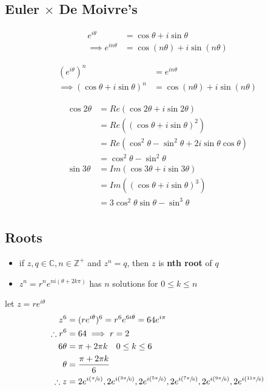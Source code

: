 	\subsection{Euler $\times$ De Moivre's}
		\begin{theorem}
			\begin{align*}
				e^{i\theta}&=\cos\theta+i\sin\theta\\
				\implies e^{in\theta}&=\cos(n\theta)+i\sin(n\theta)
			\end{align*}
		\end{theorem}
		\begin{theorem}[De Moivre's]
			\begin{align*}
				(e^{i\theta})^n&=e^{in\theta}\\
				\implies (\cos\theta+i\sin\theta)^n&=\cos(n\theta)+i\sin(n\theta)\tag*{from Euler's}
			\end{align*}
		\end{theorem}
		\begin{example}[$\cos2\theta=\cos^2\theta-\sin^2\theta\quad\sin3\theta=3\cos^2\theta\sin\theta-\sin^3\theta$]
			\begin{align*}
				\cos2\theta&=Re(\cos2\theta+i\sin2\theta)\\
				&=Re((\cos\theta+i\sin\theta)^2)\tag*{De Moivre}\\
				&=Re(\cos^2\theta-\sin^2\theta+2i\sin\theta\cos\theta)\\
				&=\cos^2\theta-\sin^2\theta\\
				\sin3\theta&=Im(\cos3\theta+i\sin3\theta)\\
			    &=Im((\cos\theta+i\sin\theta)^3)\tag*{De Moivre}\\
				&=3\cos^2\theta\sin\theta-\sin^3\theta\\
			\end{align*}
		\end{example}
	\subsection{Roots}
		\begin{theorem}[Roots]
			\begin{itemize}
			   \item if $z,q\in\mathbb{C},n\in\mathbb{Z}^+$ and $z^n=q$, then $z$ is \textbf{nth root} of $q$
			   \item $z^n=r^ne^{ni(\theta+2k\pi)}$ has $n$ solutions for $0\le k\le n$
			\end{itemize}
		\end{theorem}
		\begin{example}[Solve $z^6=-64$]
			let $z=re^{i\theta}$
			\begin{align*}
				z^6&=(re^{i\theta})^6=r^6e^{6i\theta}=64e^{i\pi}\\
				\therefore r^6&=64\implies r=2\\
				6\theta&=\pi+2\pi k\quad 0\le k\le6\\
				\theta&=\frac{\pi+2\pi k}6\\
				\therefore z&=2e^{i(\sfrac{\pi}6)},2e^{i(\sfrac{3\pi}6)},2e^{i(\sfrac{5\pi}6)},2e^{i(\sfrac{7\pi}6)},2e^{i(\sfrac{9\pi}6)},2e^{i(\sfrac{11\pi}6)}
			\end{align*}
		\end{example}
